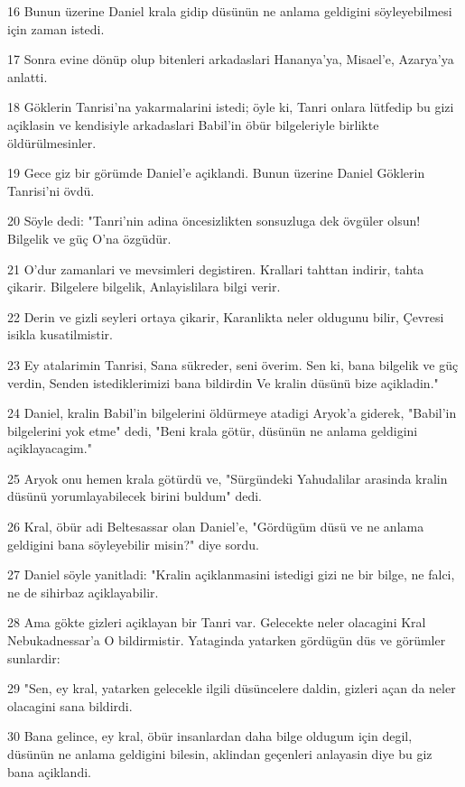 \par 16 Bunun üzerine Daniel krala gidip düsünün ne anlama geldigini söyleyebilmesi için zaman istedi.
\par 17 Sonra evine dönüp olup bitenleri arkadaslari Hananya'ya, Misael'e, Azarya'ya anlatti.
\par 18 Göklerin Tanrisi'na yakarmalarini istedi; öyle ki, Tanri onlara lütfedip bu gizi açiklasin ve kendisiyle arkadaslari Babil'in öbür bilgeleriyle birlikte öldürülmesinler.
\par 19 Gece giz bir görümde Daniel'e açiklandi. Bunun üzerine Daniel Göklerin Tanrisi'ni övdü.
\par 20 Söyle dedi: "Tanri'nin adina öncesizlikten sonsuzluga dek övgüler olsun! Bilgelik ve güç O'na özgüdür.
\par 21 O'dur zamanlari ve mevsimleri degistiren. Krallari tahttan indirir, tahta çikarir. Bilgelere bilgelik, Anlayislilara bilgi verir.
\par 22 Derin ve gizli seyleri ortaya çikarir, Karanlikta neler oldugunu bilir, Çevresi isikla kusatilmistir.
\par 23 Ey atalarimin Tanrisi, Sana sükreder, seni överim. Sen ki, bana bilgelik ve güç verdin, Senden istediklerimizi bana bildirdin Ve kralin düsünü bize açikladin."
\par 24 Daniel, kralin Babil'in bilgelerini öldürmeye atadigi Aryok'a giderek, "Babil'in bilgelerini yok etme" dedi, "Beni krala götür, düsünün ne anlama geldigini açiklayacagim."
\par 25 Aryok onu hemen krala götürdü ve, "Sürgündeki Yahudalilar arasinda kralin düsünü yorumlayabilecek birini buldum" dedi.
\par 26 Kral, öbür adi Beltesassar olan Daniel'e, "Gördügüm düsü ve ne anlama geldigini bana söyleyebilir misin?" diye sordu.
\par 27 Daniel söyle yanitladi: "Kralin açiklanmasini istedigi gizi ne bir bilge, ne falci, ne de sihirbaz açiklayabilir.
\par 28 Ama gökte gizleri açiklayan bir Tanri var. Gelecekte neler olacagini Kral Nebukadnessar'a O bildirmistir. Yataginda yatarken gördügün düs ve görümler sunlardir:
\par 29 "Sen, ey kral, yatarken gelecekle ilgili düsüncelere daldin, gizleri açan da neler olacagini sana bildirdi.
\par 30 Bana gelince, ey kral, öbür insanlardan daha bilge oldugum için degil, düsünün ne anlama geldigini bilesin, aklindan geçenleri anlayasin diye bu giz bana açiklandi.
